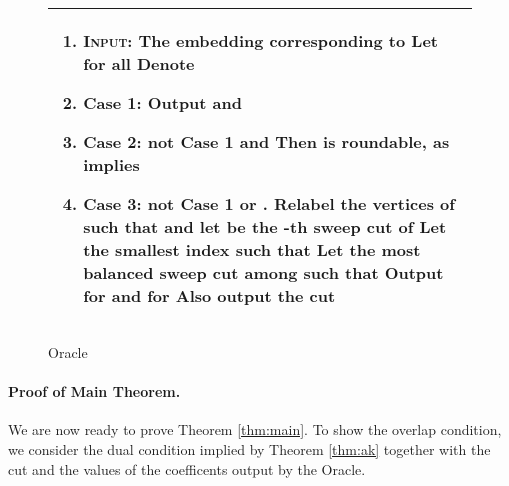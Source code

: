 \documentclass[twoside,leqno,twocolumn]{article}
\numberwithin{equation}{section}
\begin{document}
\begin{figure*}[htb]
  	\begin{tabularx}{\textwidth}{|X|}
    \hline
  	\begin{enumerate}
\item {\bf \textsc{Input:}} The embedding  corresponding to  Let  for all 
Denote 
\item {\sc Case 1}:   
	Output   and 
	\item {\sc Case 2}: not {\sc Case 1} and  Then  is roundable, as  implies 
\item \label{stp:cut} {\sc Case 3}: not {\sc Case 1} or {\sc 2}. Relabel the vertices of  such that  and let  be the -th sweep cut of  
Let  the smallest index such that  	Let  the most balanced sweep cut among  such that   Output   for  and  for  Also output the cut  
 \end{enumerate}\\
   \hline
    \end{tabularx}
  \caption{{\sc Oracle}}
  \label{fig:oracle}
\end{figure*}


\paragraph{Proof of Main Theorem.}  We are now ready to prove Theorem \ref{thm:main}. To show the overlap condition,  we consider the dual condition implied by Theorem \ref{thm:ak} together with the cut  and the values of the coefficents output by the {\sc Oracle}.
\end{document}
